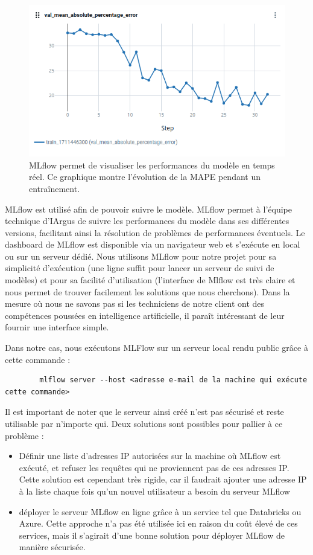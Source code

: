 \documentclass[french]{article}
\begin{document}
    \begin{figure}[h!]
        \includegraphics[width=12cm]{mlflow}
        \centering
        \caption{MLflow permet de visualiser les performances du modèle en temps réel. Ce graphique montre l'évolution de la MAPE pendant un entraînement.}
    \end{figure}

    MLflow est utilisé afin de pouvoir suivre le modèle. MLflow permet à l'équipe technique d'IArgus de suivre les performances du modèle dans ses différentes versions, facilitant ainsi la résolution de problèmes de performances éventuels. Le dashboard de MLflow est disponible via un navigateur web et s'exécute en local ou sur un serveur dédié. Nous utilisons MLflow pour notre projet pour sa simplicité d'exécution (une ligne suffit pour lancer un serveur de suivi de modèles) et pour sa facilité d'utilisation (l'interface de Mlflow est très claire et nous permet de trouver facilement les solutions que nous cherchons). Dans la mesure où nous ne savons pas si les techniciens de notre client ont des compétences poussées en intelligence artificielle, il paraît intéressant de leur fournir une interface simple.

    Dans notre cas, nous exécutons MLFlow sur un serveur local rendu public grâce à cette commande :
    \begin{verbatim}
        mlflow server --host <adresse e-mail de la machine qui exécute cette commande>
    \end{verbatim}

    Il est important de noter que le serveur ainsi créé n'est pas sécurisé et reste utilisable par n'importe qui. Deux solutions sont possibles pour pallier à ce problème :
    \begin{itemize}
        \item Définir une liste d'adresses IP autorisées sur la machine où MLflow est exécuté, et refuser les requêtes qui ne proviennent pas de ces adresses IP. Cette solution est cependant très rigide, car il faudrait ajouter une adresse IP à la liste chaque fois qu'un nouvel utilisateur a besoin du serveur MLflow
        \item déployer le serveur MLflow en ligne grâce à un service tel que Databricks ou Azure. Cette approche n'a pas été utilisée ici en raison du coût élevé de ces services, mais il s'agirait d'une bonne solution pour déployer MLflow de manière sécurisée.
    \end{itemize}
\end{document}
